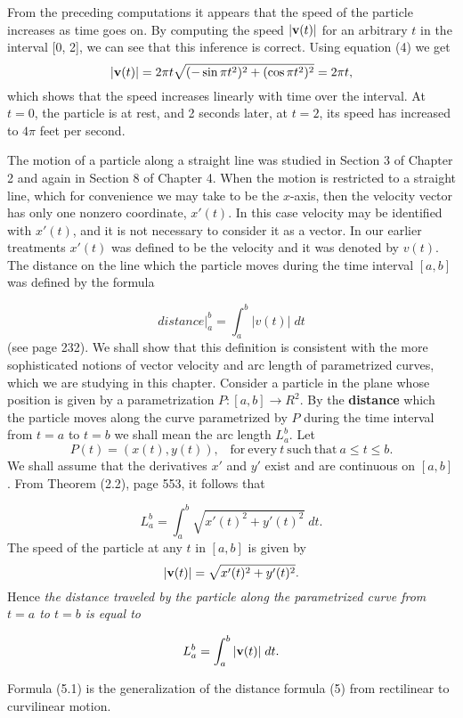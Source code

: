 \begin{example}
From the preceding computations it appears that the speed of the particle increases as time goes on. By computing the speed $|\mbox{\bf{v}}(t)|$ for an arbitrary $t$ in the interval [0, 2], we can see that this inference is correct. Using equation (4) we get
$$
|\mbox{\bf{v}}(t)| = 2\pi t \sqrt{(-\sin \pi t^2)^2 + (\cos \pi t^2)^2} = 2 \pi t,
$$
which shows that the speed increases linearly with time over the interval. At $t = 0$, the particle is at rest, and 2 seconds later, at $t = 2$, its speed has increased to $4 \pi$ feet per second.
\end{example}

The motion of a particle along a straight line was studied in Section 3 of Chapter 2 and again in Section 8 of Chapter 4. When the motion is restricted to a straight line, which for convenience we may take to be the $x$-axis, then the velocity vector has only one nonzero coordinate, $x'(t)$. In this case velocity may be identified with $x'(t)$, and it is not necessary to consider it as a vector. In our earlier treatments $x'(t)$ was defined to be the velocity and it was denoted by $v(t)$. The distance on the line which the particle moves during the time interval $[a, b]$ was defined by the formula


\begin{equation}
distance\Big|_a^b = \int_a^b |v(t)| \;dt   
\label{eq10.5.5}
\end{equation}
(see page 232). We shall show that this definition is consistent with the more sophisticated notions of vector velocity and arc length of parametrized curves, which we are studying in this chapter. Consider a particle in the plane whose position is given by a parametrization $P: [a, b] \rightarrow R^2$. By the \textbf{distance} which the particle moves along the curve parametrized by $P$ during the time interval from $t = a$ to $t = b$ we shall mean the arc length $L_a^b$. Let
$$
P(t) = (x(t), y(t)), \;\;\;\mathrm{for~every~} t \mathrm{~such~that~} a \leq t \leq b.
$$
We shall assume that the derivatives $x'$ and $y'$ exist and are continuous on $[a, b]$. From Theorem (2.2), page 553, it follows that

$$
L_a^b = \int_a^b \sqrt{x'(t)^2 + y'(t)^2} \;dt.  
$$
The speed of the particle at any $t$ in $[a, b]$ is given by
$$
|\mbox{\bf{v}}(t)| = \sqrt{x'(t)^2 + y'(t)^2} .
$$
Hence \textit{the distance traveled by the particle along the parametrized curve from $t = a$ to $t = b$ is equal to}

\begin{theorem} 
$$
L_a^b = \int_a^b |\mbox{\bf{v}}(t)| \;dt .
$$

Formula (5.1) is the generalization of the distance formula (5) from rectilinear to curvilinear motion.
\end{theorem}

